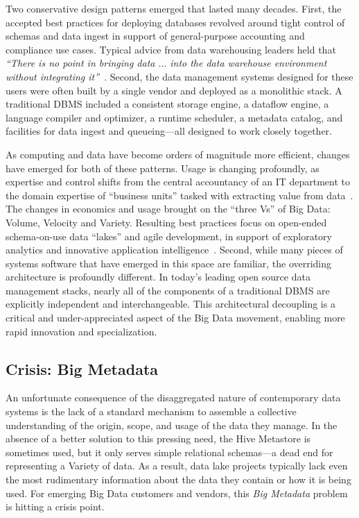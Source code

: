 \documentclass{sig-alternate}
\begin{document}
Two conservative design patterns emerged that lasted many decades. First, the accepted best practices
for deploying databases revolved around tight control of schemas and data ingest in support of 
general-purpose accounting and compliance use cases. 
Typical advice from data
warehousing leaders held that 
\emph{``There is no point in 
bringing data $\ldots$ into the data warehouse environment without integrating it''}~\cite{inmon2005building}. 
Second, 
the data management systems designed for these users were often built by a single vendor and deployed as a
monolithic stack. 
A traditional DBMS included a consistent storage engine, a dataflow engine, 
a language compiler and optimizer, a runtime scheduler, a metadata catalog, and facilities for data ingest 
and queueing---all designed to work closely together.


As computing and data have become orders of magnitude more efficient, changes have emerged for both of these patterns. 
Usage is changing profoundly, as expertise and control shifts from the central accountancy of an IT department to 
the domain expertise of ``business units'' tasked with extracting value from data~\cite{gartner}. 
The changes in economics and usage brought on the ``three Vs'' of Big Data: Volume, Velocity and Variety.
Resulting best practices focus on open-ended schema-on-use
data ``lakes'' and agile development, in support of exploratory analytics and innovative application intelligence~\cite{patil2012data}. 
Second, while many pieces of systems software that have emerged in this space are familiar, the overriding architecture is profoundly 
different. In today's leading open source
data management stacks, nearly all of the components 
of a traditional DBMS are explicitly independent 
and interchangeable.  This architectural decoupling is 
a critical and under-appreciated aspect of the Big Data movement,
enabling more rapid innovation and specialization.

\subsection{Crisis: Big Metadata}

An unfortunate consequence of the disaggregated nature of contemporary data systems
is the lack of a standard mechanism
to assemble a collective understanding of the origin, scope, and usage of the data they manage.
In the absence of a better solution to this pressing need, the 
Hive Metastore is sometimes used, but it only serves simple relational schemas---a dead end for representing a Variety of data. 
As a result, data lake projects typically lack 
even the most rudimentary information about the data they contain or how it is being used. 
For emerging Big Data customers and vendors, this \emph{Big Metadata} problem is hitting a crisis point.  
\end{document}
